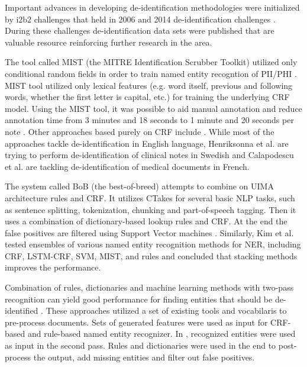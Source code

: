 \documentclass[a4paper,twoside]{article}
\begin{document}
Important advances in developing de-identification methodologies were initialized by i2b2 challenges that held in 2006 and 2014 de-identification challenges \cite{uzuner2006i2b2,stubbs2015automated}. During these challenges de-identification data sets were published that are valuable resource reinforcing further research in the area. 

The tool called MIST (the MITRE Identification Scrubber Toolkit) utilized only conditional random fields in order to train named entity recogntion of PII/PHI \cite{aberdeen2010mitre}. MIST tool utilized only lexical features (e.g. word itself, previous and following words, whether the first letter is capital, etc.) for training the underlying CRF model. Using the MIST tool, it was possible to aid manual annotation and reduce annotation time from 3 minutes and 18 seconds to 1 minute and 20 seconds per note \cite{hanauer2013bootstrapping}. Other approaches based purely on CRF include \cite{phuong2016automatic,li2019efficient,henrikssona2018detecting,calapodescu2017semi}. While most of the approaches tackle de-identification in English language, Henriksonna et al. \cite{henrikssona2018detecting} are trying to perform de-identification of clinical notes in Swedish and Calapodescu et al. \cite{calapodescu2017semi} are tackling de-identification of medical documents in French.

The system called BoB (the best-of-breed) attempts to combine on UIMA architecture rules and CRF. It utilizes CTakes for several basic NLP tasks, such as sentence splitting, tokenization, chunking and part-of-speech tagging. Then it uses a combination of dictionary-based lookup rules and CRF. At the end the false positives are filtered using Support Vector machines \cite{ferrandez2012bob}. Similarly, Kim et al. \cite{kim2018ensemble} tested ensembles of various named entity recognition methods for NER, including CRF, LSTM-CRF, SVM, MIST, and rules and concluded that stacking methods improves the performance. 

Combination of rules, dictionaries and machine learning methods with two-pass recognition can yield good performance for finding entities that should be de-identified \cite{dehghan2015combining,yang2015automatic}. These approaches utilized a set of existing tools and vocabilaris to pre-process documents. Sets of generated features were used as input for CRF-based and rule-based named entity recognizer. In \cite{dehghan2015combining}, recognized entities were used as input in the second pass. Rules and dictionaries were used in the end to post-process the output, add missing entities and filter out false positives. 
\end{document}
